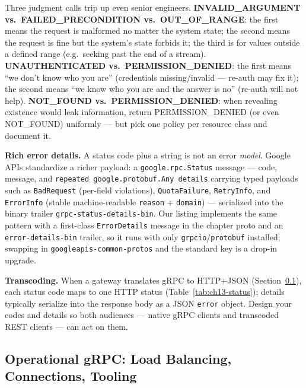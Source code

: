 Three judgment calls trip up even senior engineers. \textbf{INVALID\_ARGUMENT
vs.\ FAILED\_PRECONDITION vs.\ OUT\_OF\_RANGE}: the first means the request is
malformed no matter the system state; the second means the request is fine but
the system's state forbids it; the third is for values outside a defined range
(e.g.\ seeking past the end of a stream). \textbf{UNAUTHENTICATED
vs.\ PERMISSION\_DENIED}: the first means ``we don't know who you are''
(credentials missing/invalid --- re-auth may fix it); the second means ``we know
who you are and the answer is no'' (re-auth will not help).
\textbf{NOT\_FOUND vs.\ PERMISSION\_DENIED}: when revealing existence would
leak information, return PERMISSION\_DENIED (or even NOT\_FOUND) uniformly ---
but pick one policy per resource class and document it.

\textbf{Rich error details.} A status code plus a string is not an error
\emph{model}. Google APIs standardize a richer payload: a
\texttt{google.rpc.Status} message --- code, message, and \texttt{repeated
google.protobuf.Any details} carrying typed payloads such as
\texttt{BadRequest} (per-field violations), \texttt{QuotaFailure},
\texttt{RetryInfo}, and \texttt{ErrorInfo} (stable machine-readable
\texttt{reason} + \texttt{domain}) --- serialized into the binary trailer
\texttt{grpc-status-details-bin}. Our listing implements the same pattern with a
first-class \texttt{ErrorDetails} message in the chapter proto and an
\texttt{error-details-bin} trailer, so it runs with only
\texttt{grpcio}/\texttt{protobuf} installed; swapping in
\texttt{googleapis-common-protos} and the standard key is a drop-in upgrade.

\textbf{Transcoding.} When a gateway translates gRPC to HTTP+JSON
(Section~\ref{subsec:ch13-operational}), each status code maps to one HTTP
status (Table~\ref{tab:ch13-status}); details typically serialize into the
response body as a JSON \texttt{error} object. Design your codes and details so
both audiences --- native gRPC clients and transcoded REST clients --- can act
on them.

\subsection{Operational gRPC: Load Balancing, Connections, Tooling}
\label{subsec:ch13-operational}

